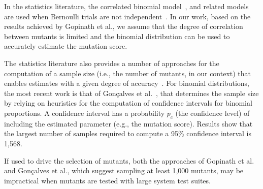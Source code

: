 In the statistics literature, the correlated binomial model~\cite{Bahadur}, 
and related models~\cite{Kupper1978,NG:ModifiedBinomialDistributions:1989,VanDerGeest:2005} are used when Bernoulli trials are not independent~\cite{Zhang:CrrelatedFirearm:NIST:2019}. 
In our work, based on the results achieved by Gopinath et al., we assume that the degree of correlation between mutants is limited and the binomial distribution can be used to accurately estimate the mutation score.



The statistics literature also provides a number of approaches for the computation of a sample size (i.e., the number of mutants, in our context) that enables estimates with a given degree of accuracy~\cite{Krejcie,Cochran,Bartlett,Krishnamoorthy07}. 
For binomial distributions, the most recent work is that of Gonçalves et al.~\cite{Goncalves2012}, that
determines the sample size by
relying on heuristics for the computation of confidence intervals for binomial proportions. 
A confidence interval has a probability $p_c$ (the confidence level) of including the estimated parameter (e.g., the mutation score). 
Results show that the largest number of samples required to compute a 95\% confidence interval is 1,568. 

If used to drive the selection of mutants, both the approaches of Gopinath et al. and Gonçalves et al., which suggest sampling at least 1,000 mutants, may be impractical when mutants are tested with large system test suites.



